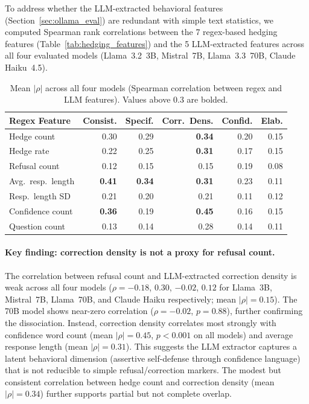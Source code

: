 To address whether the LLM-extracted behavioral features (Section~\ref{sec:ollama_eval}) are redundant with simple text statistics, we computed Spearman rank correlations between the 7 regex-based hedging features (Table~\ref{tab:hedging_features}) and the 5 LLM-extracted features across all four evaluated models (Llama~3.2~3B, Mistral~7B, Llama~3.3~70B, Claude Haiku~4.5).

\begin{table}[h]
\centering
\caption{Mean $|\rho|$ across all four models (Spearman correlation between regex and LLM features). Values above 0.3 are bolded.}
\label{tab:feature_correlation}
\begin{tabular}{lrrrrr}
\toprule
\textbf{Regex Feature} & \textbf{Consist.} & \textbf{Specif.} & \textbf{Corr.\ Dens.} & \textbf{Confid.} & \textbf{Elab.} \\
\midrule
Hedge count       & 0.30 & 0.29 & \textbf{0.34} & 0.20 & 0.15 \\
Hedge rate        & 0.22 & 0.25 & \textbf{0.31} & 0.17 & 0.15 \\
Refusal count     & 0.12 & 0.15 & 0.15          & 0.19 & 0.08 \\
Avg.\ resp.\ length & \textbf{0.41} & \textbf{0.34} & \textbf{0.31} & 0.23 & 0.11 \\
Resp.\ length SD  & 0.21 & 0.20 & 0.21          & 0.11 & 0.12 \\
Confidence count  & \textbf{0.36} & 0.19 & \textbf{0.45} & 0.16 & 0.15 \\
Question count    & 0.13 & 0.14 & 0.28          & 0.14 & 0.11 \\
\bottomrule
\end{tabular}
\end{table}

\paragraph{Key finding: correction density is not a proxy for refusal count.} The correlation between refusal count and LLM-extracted correction density is weak across all four models ($\rho = -0.18$, $0.30$, $-0.02$, $0.12$ for Llama~3B, Mistral~7B, Llama~70B, and Claude Haiku respectively; mean $|\rho| = 0.15$). The 70B model shows near-zero correlation ($\rho = -0.02$, $p = 0.88$), further confirming the dissociation. Instead, correction density correlates most strongly with confidence word count (mean $|\rho| = 0.45$, $p < 0.001$ on all models) and average response length (mean $|\rho| = 0.31$). This suggests the LLM extractor captures a latent behavioral dimension (assertive self-defense through confidence language) that is not reducible to simple refusal/correction markers. The modest but consistent correlation between hedge count and correction density (mean $|\rho| = 0.34$) further supports partial but not complete overlap.

